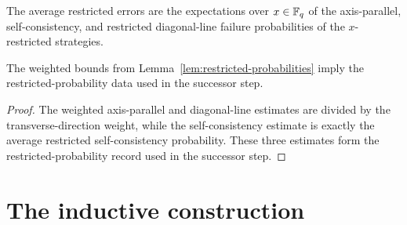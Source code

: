 \begin{definition}\label{def:average-restricted-errors}
	\leanok
	The average restricted errors are the expectations over $x \in \mathbb{F}_q$ of the
	axis-parallel, self-consistency, and restricted diagonal-line failure
	probabilities of the $x$-restricted strategies.
\end{definition}

\begin{lemma}\label{lem:weighted-restricted-probability-bounds}
	\leanok
	The weighted bounds from Lemma~\ref{lem:restricted-probabilities} imply the
	restricted-probability data used in the successor step.
\end{lemma}
\begin{proof}
	\leanok
	The weighted axis-parallel and diagonal-line estimates are divided by the
	transverse-direction weight, while the self-consistency estimate is exactly
	the average restricted self-consistency probability. These three estimates
	form the restricted-probability record used in the successor step.
\end{proof}

\section{The inductive construction}

